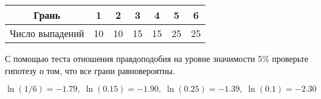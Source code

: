 \begin{enumerate}[resume]
			 \begin{center}
		\begin{tabular}{c|cccccc}
			\toprule
			Грань & 1 & 2 & 3 & 4 & 5 & 6\\
			\midrule
							Число выпадений & 10 & 10 & 15 & 15 & 25 & 25 \\
			\bottomrule
		\end{tabular}
	\end{center}

С помощью теста отношения правдоподобия на уровне значимости 5\% проверьте гипотезу о том, что все грани равновероятны.

\[
\ln(1/6)=-1.79, \; \ln(0.15)=-1.90, \; \ln(0.25)=-1.39, \; \ln(0.1)=-2.30
\]

\end{enumerate}
